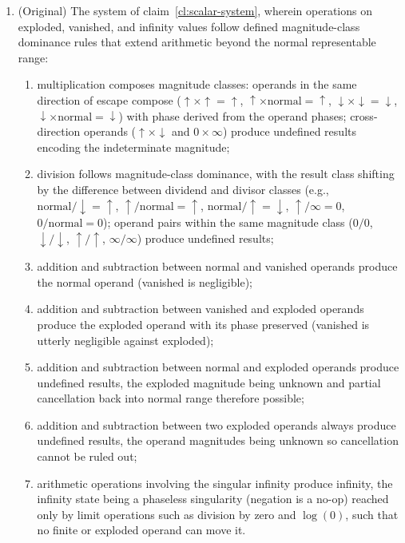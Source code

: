 \documentclass[12pt,letter]{article}
\begin{document}
\begin{enumerate}
    \item (Original) The system of claim~\ref{cl:scalar-system}, wherein operations on exploded, vanished, and infinity values follow defined magnitude-class dominance rules that extend arithmetic beyond the normal representable range:
          \begin{enumerate}
              \item multiplication composes magnitude classes: operands in the same direction of escape compose ($\uparrow \times \uparrow = \uparrow$, $\uparrow \times \text{normal} = \uparrow$, $\downarrow \times \downarrow = \downarrow$, $\downarrow \times \text{normal} = \downarrow$) with phase derived from the operand phases; cross-direction operands ($\uparrow \times \downarrow$ and $0 \times \infty$) produce undefined results encoding the indeterminate magnitude;
              \item division follows magnitude-class dominance, with the result class shifting by the difference between dividend and divisor classes (e.g., $\text{normal} / \downarrow = \uparrow$, $\uparrow / \text{normal} = \uparrow$, $\text{normal} / \uparrow = \downarrow$, $\uparrow / \infty = 0$, $0 / \text{normal} = 0$); operand pairs within the same magnitude class ($0/0$, $\downarrow / \downarrow$, $\uparrow / \uparrow$, $\infty / \infty$) produce undefined results;
              \item addition and subtraction between normal and vanished operands produce the normal operand (vanished is negligible);
              \item addition and subtraction between vanished and exploded operands produce the exploded operand with its phase preserved (vanished is utterly negligible against exploded);
              \item addition and subtraction between normal and exploded operands produce undefined results, the exploded magnitude being unknown and partial cancellation back into normal range therefore possible;
              \item addition and subtraction between two exploded operands always produce undefined results, the operand magnitudes being unknown so cancellation cannot be ruled out;
              \item arithmetic operations involving the singular infinity produce infinity, the infinity state being a phaseless singularity (negation is a no-op) reached only by limit operations such as division by zero and $\log(0)$, such that no finite or exploded operand can move it.
          \end{enumerate}


\end{enumerate}
\end{document}
